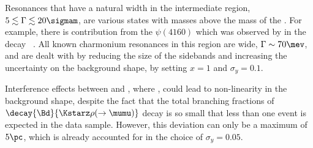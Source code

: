 Resonances that have a natural width in the intermediate region, $5\lesssim\Gamma\lesssim20\sigmam$, are
various \ccbar states with masses above the mass of the \psitwos.
For example, there is contribution from the $\psi(4160)$ which was observed by \lhcb in the decay
\decay{\Bp}{\Kp\mumu}~\cite{LHCb-PAPER-2013-039}.
All known charmonium resonances in this region are wide,
$\Gamma\sim70\mev$, and are dealt with by reducing the size of the sidebands and increasing the
uncertainty on the background shape, by setting $x=1$ and $\sigma_y=0.1$.



Interference effects between
\btokstrmumu and \decay{\Bd}{\Kstarz\rho}, where \decay{\rho}{\mumu}, could lead to non-linearity
in the background shape, despite the fact that the total branching fractions of
$\decay{\Bd}{\Kstarz\rho(\to\mumu)}$ decay is so small that less than one event is expected in the
data sample.
However, this deviation can only be a maximum of \approx$5\pc$, which is already accounted for in
the choice of $\sigma_y=0.05$.

